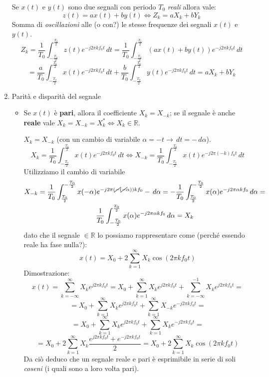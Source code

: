\documentclass[
]{article}
\begin{document}
\begin{enumerate}
  Se \(x(t)\) e \(y(t)\) sono due segnali con periodo \(T_0\)
  \emph{reali} allora vale: \[
   z(t)=ax(t)+by(t) \Longleftrightarrow Z_{k} = aX_{k} + bY_{k}
   \] Somma di \emph{oscillazioni} alle (o con?) le stesse frequenze dei
  segnali \(x(t)\) e \(y(t)\). \[
   Z_{k} = \frac{1}{T_0} \int_{-\frac{T_0}{2}}^{\frac{T_0}{2}} z(t) e^{-j2\pi kf_{0}t} \,dt = \frac{1}{T_0} \int_{-\frac{T_0}{2}}^{\frac{T_0}{2}} (ax(t)+by(t)) e^{-j2\pi kf_{0}t} \,dt 
   \] \[
   = \frac{a}{T_0} \int_{-\frac{T_0}{2}}^{\frac{T_0}{2}} x(t) e^{-j2\pi kf_{0}t} \,dt + \frac{b}{T_0} \int_{-\frac{T_0}{2}}^{\frac{T_0}{2}} y(t) e^{-j2\pi kf_{0}t} \,dt = aX_{k}+bY_{k}
   \]
\item
  Parità e disparità del segnale

  \begin{itemize}
  \item
    Se \(x(t)\) è \textbf{pari}, allora il coefficiente
    \(X_{k} = X_{-k}\); se il segnale è anche \textbf{reale} vale
    \(X_{k}=X_{-k}=X^{*}_{k} \Longleftrightarrow X_k \in \mathbb{R}\).

    \(X_k = X_{-k}\) (con un cambio di variabile
    \(\alpha=-t \to \,dt=-\,d\alpha\)). \[
      X_{k} = \frac{1}{T_0} \int_{-\frac{T_0}{2}}^{\frac{T_0}{2}} x(t) e^{-j2\pi kf_{0}t} \,dt \Longleftrightarrow X_{-k} = \frac{1}{T_0} \int_{-\frac{T_0}{2}}^{\frac{T_0}{2}} x(t) e^{-j2\pi (-k)f_{0}t} \,dt 
      \] Utilizziamo il cambio di variabile \begin{gather*}
      X_{-k} = \frac{1}{T_0} \int_{\frac{T_0}{2}}^{-\frac{T_0}{2}} x(-\alpha) e^{-j2\pi (\cancel{-}(\cancel{-}\alpha)) kf_{0}} -\,d\alpha = -\frac{1}{T_0} \int_{\frac{T_0}{2}}^{-\frac{T_0}{2}} x(\alpha) e^{-j2\pi\alpha kf_{0}} \,d\alpha =
      \\ 
      \frac{1}{T_0} \int_{-\frac{T_0}{2}}^{\frac{T_0}{2}} x(\alpha) e^{-j2\pi\alpha kf_{0}} \,d\alpha = X_k
      \end{gather*} dato che il segnale \(\in \mathbb{R}\) lo possiamo
    rappresentare come (perché essendo reale ha fase nulla?): \[
      x(t) = X_{0} + 2\sum_{k=1}^{\infty}X_{k}\cos(2\pi kf_{0}t)
      \] Dimostrazione: \[
      x(t) = \sum_{k=-\infty}^{\infty} X_{k} e^{j2\pi kf_{0}t} = X_{0} + \sum_{k=1}^{\infty} X_{k} e^{j2\pi kf_{0}t} + \sum_{k=-\infty}^{-1} X_{k} e^{j2\pi kf_{0}t} =
      \] \[
      = X_{0} + \sum_{k=1}^{\infty} X_{k} e^{j2\pi kf_{0}t} + \sum_{k=1}^{\infty} X_{-k} e^{-j2\pi kf_{0}t} =
      \] \[
      = X_{0} + \sum_{k=1}^{\infty} X_{k} e^{j2\pi kf_{0}t} + \sum_{k=1}^{\infty} X_{k} e^{-j2\pi kf_{0}t} =
      \] \[
      = X_{0} + 2 \sum_{k=1}^{\infty} X_{k} \frac{e^{j2\pi kf_{0}t}+ e^{-j2\pi kf_{0}t}}{2} = X_{0} + 2 \sum_{k=1}^{\infty} X_{k} \cos{(2\pi k f_{0}t)}
      \] Da ciò deduco che un segnale reale e pari è esprimibile in
    serie di soli \emph{coseni} (i quali sono a loro volta pari).


\end{itemize}
\end{enumerate}
\end{document}
